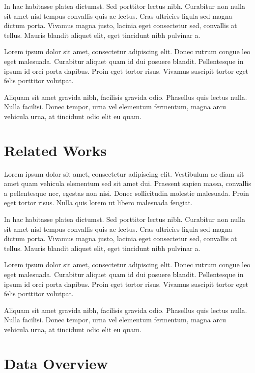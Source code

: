 \documentclass[12pt,twocolumn]{article}
\begin{document}
In hac habitasse platea dictumst. Sed porttitor lectus nibh. Curabitur non nulla sit amet nisl tempus convallis quis ac lectus. Cras ultricies ligula sed magna dictum porta. Vivamus magna justo, lacinia eget consectetur sed, convallis at tellus. Mauris blandit aliquet \citet{he2016deep} elit, eget tincidunt nibh pulvinar a.

Lorem ipsum dolor sit amet, consectetur adipiscing elit. Donec rutrum congue leo eget malesuada. Curabitur aliquet quam id dui posuere blandit. Pellentesque in ipsum id orci porta dapibus. Proin eget tortor risus. Vivamus suscipit tortor eget felis porttitor volutpat.

Aliquam sit amet gravida nibh, facilisis gravida odio. Phasellus quis lectus nulla. Nulla facilisi. Donec tempor, urna vel elementum fermentum, magna arcu vehicula urna, at tincidunt odio elit eu quam.

\section{Related Works}

Lorem ipsum dolor sit amet, consectetur adipiscing elit. Vestibulum ac diam sit amet quam vehicula elementum sed sit amet dui. Praesent sapien massa, convallis a pellentesque nec, egestas non nisi. Donec sollicitudin molestie malesuada. Proin eget tortor risus. Nulla quis lorem ut libero malesuada feugiat.

In hac habitasse platea dictumst. Sed porttitor lectus nibh. Curabitur non nulla sit amet nisl tempus convallis quis ac lectus. Cras ultricies ligula sed magna dictum porta. Vivamus magna justo, lacinia eget consectetur sed, convallis at tellus. Mauris blandit aliquet elit, eget tincidunt nibh pulvinar a.

Lorem ipsum dolor sit amet, consectetur adipiscing elit. Donec rutrum congue leo eget malesuada. Curabitur aliquet quam id dui posuere blandit. Pellentesque in ipsum id orci porta dapibus. Proin eget tortor risus. Vivamus suscipit tortor eget felis porttitor volutpat.

Aliquam sit amet gravida nibh, facilisis gravida odio. Phasellus quis lectus nulla. Nulla facilisi. Donec tempor, urna vel elementum fermentum, magna arcu vehicula urna, at tincidunt odio elit eu quam.

\section{Data Overview}
\end{document}

